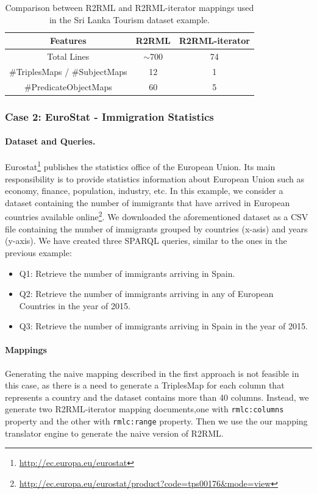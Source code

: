 \begin{table}[tbp]
\caption[R2RML vs R2RML-iterator in Sri Lanka dataset]{Comparison between R2RML and R2RML-iterator mappings used in the Sri Lanka Tourism dataset example.}
\label{table:compare1}
\begin{tabular}{c|c|c}
\hline
\textbf{Features} & \textbf{R2RML}   & \textbf{R2RML-iterator}  \\ \hline
Total Lines   & $\sim$700 & 74 \\ 
\#TriplesMaps / \#SubjectMaps     & 12                & 1           \\
\#PredicateObjectMaps  & 60              & 5            \\ \hline
\end{tabular}
\end{table}

\subsubsection{Case 2: EuroStat - Immigration Statistics}
\noindent\paragraph{Dataset and Queries.} Eurostat\footnote{\url{http://ec.europa.eu/eurostat}} publishes the statistics office of the European Union. Its main responsibility is to provide statistics information about European Union such as economy, finance, population, industry, etc. In this example, we consider a dataset containing the number of immigrants that have arrived in European countries available online\footnote{\url{http://ec.europa.eu/eurostat/product?code=tps00176&mode=view}}. We downloaded the aforementioned dataset as a CSV file containing the number of immigrants grouped by countries (x-asis) and years (y-axis). We have created three SPARQL queries, similar to the ones in the previous example:

\begin{itemize}
\item Q1: Retrieve the number of immigrants arriving in Spain.
\item Q2: Retrieve the number of immigrants arriving in any of European Countries in the year of 2015.
\item Q3: Retrieve the number of immigrants arriving in Spain in the year of 2015.
\end{itemize}

\noindent\paragraph{Mappings}
Generating the naive mapping described in the first approach is not feasible in this case, as there is a need to generate a TriplesMap for each column that represents a country and the dataset contains more than 40 columns. Instead, we generate two R2RML-iterator mapping documents,one with \texttt{rmlc:columns} property and the other with \texttt{rmlc:range} property. Then we use the our mapping translator engine to generate the naive version of R2RML.

